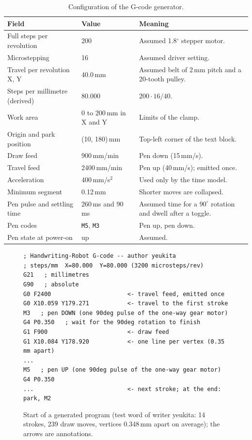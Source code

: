 \begin{table}[!htbp]
\centering
\fontsize{9.5}{11.5}\selectfont
\begin{tabularx}{\linewidth}{|p{4.2cm}|p{2.2cm}|X|}
\hline
\textbf{Field} & \textbf{Value} & \textbf{Meaning} \\
\hline
Full steps per revolution & 200 & Assumed 1.8$^\circ$ stepper motor. \\
\hline
Microstepping & 16 & Assumed driver setting. \\
\hline
Travel per revolution X, Y & 40.0\,mm & Assumed belt of 2\,mm pitch and a 20-tooth pulley. \\
\hline
Steps per millimetre (derived) & 80.000 & $200\cdot16/40$. \\
\hline
Work area & 0 to 200\,mm in X and Y & Limits of the clamp. \\
\hline
Origin and park position & (10, 180)\,mm & Top-left corner of the text block. \\
\hline
Draw feed & 900\,mm/min & Pen down (15\,mm/s). \\
\hline
Travel feed & 2400\,mm/min & Pen up (40\,mm/s); emitted once. \\
\hline
Acceleration & 400\,mm/s$^2$ & Used only by the time model. \\
\hline
Minimum segment & 0.12\,mm & Shorter moves are collapsed. \\
\hline
Pen pulse and settling time & 260\,ms and 90\,ms & Assumed time for a $90^\circ$ rotation and dwell after a toggle. \\
\hline
Pen codes & \texttt{M5}, \texttt{M3} & Pen up, pen down. \\
\hline
Pen state at power-on & up & Assumed. \\
\hline
\end{tabularx}
\caption{Configuration of the G-code generator.}
\label{tab:gc-config}
\end{table}

\begin{figure}[!htbp]
\begin{lstlisting}[basicstyle=\ttfamily\footnotesize,frame=none]
; Handwriting-Robot G-code -- author yeukita
; steps/mm  X=80.000  Y=80.000 (3200 microsteps/rev)
G21   ; millimetres
G90   ; absolute
G0 F2400                      <- travel feed, emitted once
G0 X10.059 Y179.271           <- travel to the first stroke
M3   ; pen DOWN (one 90deg pulse of the one-way gear motor)
G4 P0.350   ; wait for the 90deg rotation to finish
G1 F900                       <- draw feed
G1 X10.084 Y178.920           <- one line per vertex (0.35 mm apart)
...
M5   ; pen UP (one 90deg pulse of the one-way gear motor)
G4 P0.350
...                           <- next stroke; at the end: park, M2
\end{lstlisting}
\caption{Start of a generated program (test word of writer yeukita: 14 strokes, 239 draw moves, vertices 0.348\,mm apart on average); the arrows are annotations.}
\label{fig:gc-excerpt}
\end{figure}

